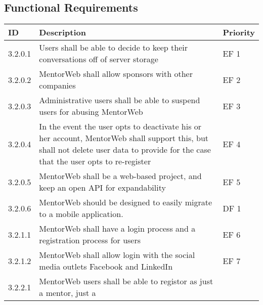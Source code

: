 \documentclass[11pt]{article}
\begin{document}
    \subsection{Functional Requirements}
    \begin{center}
    \begin{longtable}{|l|p{8 cm}|l|}
        \hline
        ID      & Description                             & Priority \\ \hline
        3.2.0.1 & Users shall be able to decide to keep
                  their conversations\index{Conversation}
                  off of server storage                   & EF 1  \\ \hline
        3.2.0.2 & MentorWeb shall allow
                  sponsors\index{Sponsor} with other
                  companies                               & EF 2  \\ \hline
        3.2.0.3 & Administrative users shall be able to
                  suspend users for abusing
                  MentorWeb\index{MentorWeb}              & EF 3  \\ \hline
        3.2.0.4 & In the event the user opts to deactivate
                  his or her account,
                  MentorWeb\index{MentorWeb} shall
                  support this, but shall not delete user
                  data to provide for the case that the
                  user opts to re-register                & EF 4  \\ \hline
        3.2.0.5 & MentorWeb\index{MentorWeb} shall be a
                  web-based project, and keep an open API
                  for expandability                       & EF 5  \\ \hline
                  3.2.0.6 & MentorWeb\index{MentorWeb}
                  should be designed to easily migrate to
                  a mobile application.                   & DF 1  \\ \hline
        3.2.1.1 & MentorWeb\index{MentorWeb} shall have a
                  login process and a registration process
                  for users                               & EF 6  \\ \hline
        3.2.1.2 & MentorWeb\index{MentorWeb} shall allow
                  login with the social media outlets
                  Facebook\index{Facebook} and
                  LinkedIn\index{LinkedIn}                & EF 7  \\ \hline
        3.2.2.1 & MentorWeb\index{MentorWeb} users shall
                  be able to registor as just a
                  mentor\index{Mentor}, just a

\end{longtable}
\end{center}
\end{document}
